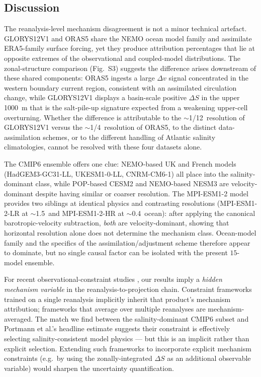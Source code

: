 \documentclass[12pt,a4paper]{article}
\begin{document}
\subsection*{Discussion}
The reanalysis-level mechanism disagreement is not a minor technical
artefact. GLORYS12V1 and ORAS5 share the NEMO ocean model family and
assimilate ERA5-family surface forcing, yet they produce attribution
percentages that lie at opposite extremes of the observational and
coupled-model distributions. The zonal-structure comparison
(Fig.~S3) suggests the difference arises downstream of these shared
components: ORAS5 ingests a large $\Delta v$ signal concentrated in
the western boundary current region, consistent with an assimilated
circulation change, while GLORYS12V1 displays a basin-scale positive
$\Delta S$ in the upper 1000~m that is the salt-pile-up signature
expected from a weakening upper-cell overturning. Whether the
difference is attributable to the $\sim$1/12\textdegree\ resolution of
GLORYS12V1 versus the $\sim$1/4\textdegree\ resolution of ORAS5, to
the distinct data-assimilation schemes, or to the different handling
of Atlantic salinity climatologies, cannot be resolved with these
four datasets alone.

The CMIP6 ensemble offers one clue: NEMO-based UK and French models
(HadGEM3-GC31-LL, UKESM1-0-LL, CNRM-CM6-1) all place into the
salinity-dominant class, while POP-based CESM2 and NEMO-based
NESM3 are velocity-dominant despite having similar or coarser
resolution. The MPI-ESM1-2 model provides two siblings at identical
physics and contrasting resolutions (MPI-ESM1-2-LR at $\sim$1.5\textdegree\
and MPI-ESM1-2-HR at $\sim$0.4\textdegree\ ocean): after applying
the canonical barotropic-velocity subtraction, \emph{both} are
velocity-dominant, showing that horizontal resolution alone does
not determine the mechanism class. Ocean-model family and the
specifics of the assimilation/adjustment scheme therefore appear
to dominate, but no single causal factor can be isolated with the
present $15$-model ensemble.

For recent observational-constraint studies
\citep{Portmann2026, Dong2024}, our results imply a \emph{hidden
mechanism variable} in the reanalysis-to-projection chain. Constraint
frameworks trained on a single reanalysis implicitly inherit that
product's mechanism attribution; frameworks that average over
multiple reanalyses are mechanism-averaged. The match we find between
the salinity-dominant CMIP6 subset and Portmann et al.'s
headline estimate suggests their constraint is effectively selecting
salinity-consistent model physics --- but this is an implicit rather
than explicit selection. Extending such frameworks to incorporate
explicit mechanism constraints (e.g.\ by using the zonally-integrated
$\Delta S$ as an additional observable variable) would sharpen the
uncertainty quantification.
\end{document}
